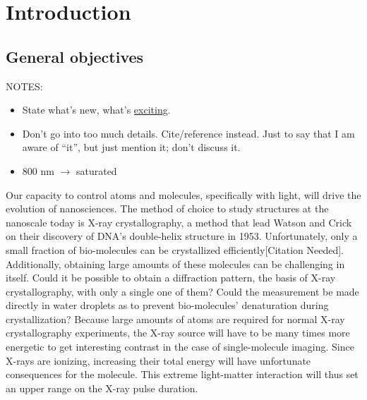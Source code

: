 \section{Introduction}


\subsection{General objectives}


NOTES:
\begin{itemize}
\item State what's new, what's \underline{exciting}.
\item Don't go into too much details. Cite/reference instead. Just to say that
I am aware of ``it'', but just mention it; don't discuss it.
\item 800 nm $\rightarrow$ saturated
\end{itemize}

Our capacity to control atoms and molecules, specifically with light,
will drive the evolution of nanosciences. The method of choice to study
structures at the nanoscale today is X-ray crystallography, a method that lead
Watson and Crick on their discovery of DNA's double-helix structure in 1953.
Unfortunately, only a small fraction of bio-molecules can be crystallized
efficiently[Citation Needed]. Additionally, obtaining large amounts of these
molecules can be challenging in itself\cite{Young2010}. Could it be
possible to obtain a diffraction pattern,
the basis of X-ray crystallography, with only a single one of them? Could the
measurement be made directly in water droplets as to prevent bio-molecules'
denaturation during crystallization? Because large amounts of atoms are
required for normal X-ray crystallography experiments, the X-ray source will
have to be many times more energetic to get interesting contrast in the
case of single-molecule imaging. Since X-rays are ionizing, increasing their
total energy will have unfortunate consequences for the molecule. This
extreme light-matter interaction will thus set an upper range on the X-ray
pulse duration.

